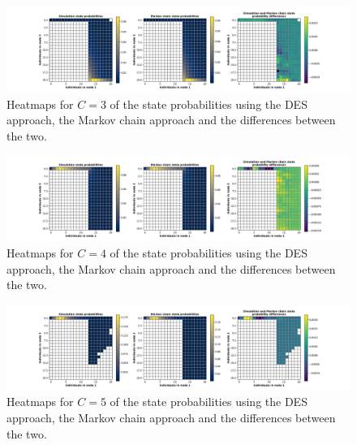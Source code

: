 \begin{figure}[H]
    \includegraphics[width=\textwidth, trim=100 10 100 10, clip]{chapters/03_queueing_model/Bin/numeric_results_and_timings/steady_state_probabilities_2/main_3.pdf}
    \caption{Heatmaps for \(C = 3\) of the state probabilities using the
    DES approach, the Markov chain approach and the differences between the
    two.}
    \label{fig:comparison_steady_state_probabilities_2_3}
\end{figure}

\begin{figure}[H]
    \includegraphics[width=\textwidth, trim=100 10 100 10, clip]{chapters/03_queueing_model/Bin/numeric_results_and_timings/steady_state_probabilities_2/main_4.pdf}
    \caption{Heatmaps for \(C = 4\) of the state probabilities using the
    DES approach, the Markov chain approach and the differences between the
    two.}
    \label{fig:comparison_steady_state_probabilities_2_4}
\end{figure}

\begin{figure}[H]
    \includegraphics[width=\textwidth, trim=100 10 100 10, clip]{chapters/03_queueing_model/Bin/numeric_results_and_timings/steady_state_probabilities_2/main_5.pdf}
    \caption{Heatmaps for \(C = 5\) of the state probabilities using the
    DES approach, the Markov chain approach and the differences between the
    two.}
    \label{fig:comparison_steady_state_probabilities_2_5}
\end{figure}


